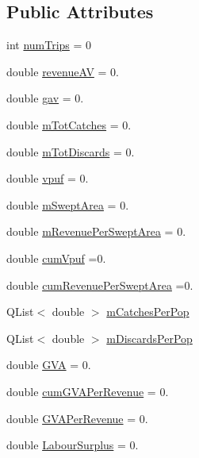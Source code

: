 \subsection*{Public Attributes}
\begin{DoxyCompactItemize}
\item 
int \mbox{\hyperlink{class_metier_stats_acbd5f85f9b28c04e12ac2bccd0b41b39}{num\+Trips}} = 0
\item 
double \mbox{\hyperlink{class_metier_stats_a33f61ecceb8220861ca85aa5ff90cce1}{revenue\+AV}} = 0.
\item 
double \mbox{\hyperlink{class_metier_stats_a6fcbe5c40cd408b501f2be71e536e626}{gav}} = 0.
\item 
double \mbox{\hyperlink{class_metier_stats_a3b8f3f7e79fb8d8cbd28b62a8402d4d3}{m\+Tot\+Catches}} = 0.
\item 
double \mbox{\hyperlink{class_metier_stats_a5404da2138dc0e913e035879192d7d3a}{m\+Tot\+Discards}} = 0.
\item 
double \mbox{\hyperlink{class_metier_stats_a19114fb82a0d58217cd2a8bd0d7d2b4b}{vpuf}} = 0.
\item 
double \mbox{\hyperlink{class_metier_stats_ac08c8dd55155caca95f287f3c29788bb}{m\+Swept\+Area}} = 0.
\item 
double \mbox{\hyperlink{class_metier_stats_aa783caa03e007800b5e9676d92314def}{m\+Revenue\+Per\+Swept\+Area}} = 0.
\item 
double \mbox{\hyperlink{class_metier_stats_a77626502aa441ede732e39a62652f6af}{cum\+Vpuf}} =0.
\item 
double \mbox{\hyperlink{class_metier_stats_ab24e99377aedd55ad079a890a7232932}{cum\+Revenue\+Per\+Swept\+Area}} =0.
\item 
Q\+List$<$ double $>$ \mbox{\hyperlink{class_metier_stats_a53b113c0506d09e6f9c418dc99347fd3}{m\+Catches\+Per\+Pop}}
\item 
Q\+List$<$ double $>$ \mbox{\hyperlink{class_metier_stats_a6b5c4be14f30c60beddf7b93e91d0ec1}{m\+Discards\+Per\+Pop}}
\item 
double \mbox{\hyperlink{class_metier_stats_a018c9aa7557d85f00af7fa13e2f7436b}{G\+VA}} = 0.
\item 
double \mbox{\hyperlink{class_metier_stats_a2045f28ac82ebb51cdab5481df1675e6}{cum\+G\+V\+A\+Per\+Revenue}} = 0.
\item 
double \mbox{\hyperlink{class_metier_stats_a1f26c14a3c047bfc8da38f610b140ea8}{G\+V\+A\+Per\+Revenue}} = 0.
\item 
double \mbox{\hyperlink{class_metier_stats_a908f622660ab00bac04d609a239b06a0}{Labour\+Surplus}} = 0.

\end{DoxyCompactItemize}
